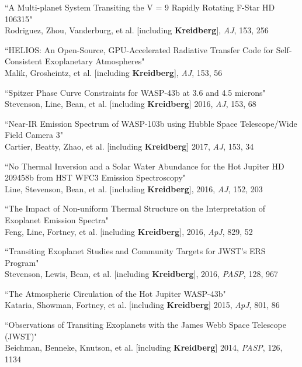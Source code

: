 \documentclass[12pt,letterpaper]{article}
\begin{document}
\begin{compactenum}
\item ``A Multi-planet System Transiting the V = 9 Rapidly Rotating F-Star HD 106315"\\
Rodriguez, Zhou, Vanderburg, et al. [including \textbf{Kreidberg}], \textit{AJ}, 153, 256

\item ``HELIOS: An Open-Source, GPU-Accelerated Radiative Transfer Code for Self-Consistent Exoplanetary Atmospheres"\\
Malik, Grosheintz,  et al. [including \textbf{Kreidberg}], \textit{AJ}, 153, 56 

\item ``Spitzer Phase Curve Constraints for WASP-43b at 3.6 and 4.5 microns"\\
Stevenson, Line, Bean, et al. [including \textbf{Kreidberg}] 2016, \textit{AJ}, 153, 68 

\item ``Near-IR Emission Spectrum of WASP-103b using Hubble Space Telescope/Wide Field Camera 3"\\
Cartier, Beatty, Zhao, et al. [including \textbf{Kreidberg}] 2017, \textit{AJ}, 153, 34


\item ``No Thermal Inversion and a Solar Water Abundance for the Hot Jupiter HD 209458b from HST WFC3 Emission Spectroscopy"\\
Line, Stevenson, Bean, et al. [including \textbf{Kreidberg}], 2016, \textit{AJ}, 152, 203 

\item ``The Impact of Non-uniform Thermal Structure on the Interpretation of Exoplanet Emission Spectra"\\
Feng, Line, Fortney, et al. [including \textbf{Kreidberg}], 2016, \textit{ApJ}, 829, 52

\item ``Transiting Exoplanet Studies and Community Targets for JWST's ERS Program"\\
Stevenson, Lewis, Bean, et al. [including \textbf{Kreidberg}], 2016, \textit{PASP}, 128, 967 

\item ``The Atmospheric Circulation of the Hot Jupiter WASP-43b" \\
Kataria, Showman, Fortney, et al. [including \textbf{Kreidberg}] 2015, \textit{ApJ}, 801, 86

\item ``Observations of Transiting Exoplanets with the James Webb Space Telescope (JWST)"\\
Beichman, Benneke, Knutson, et al. [including \textbf{Kreidberg}] 2014, \textit{PASP}, 126, 1134


\end{compactenum}
\end{document}
